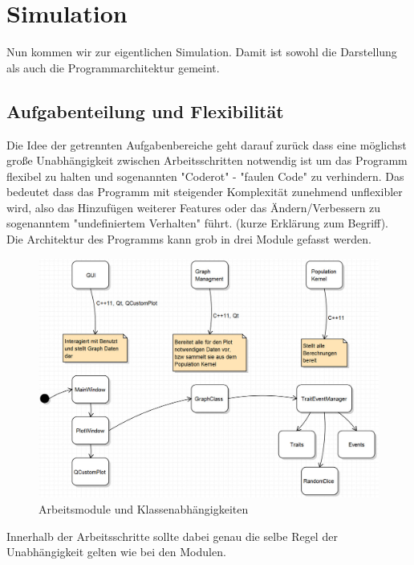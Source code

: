 \documentclass[11pt, a4paper, german]{article}
\begin{document}
\clearpage
\section{Simulation}

Nun kommen wir zur eigentlichen Simulation. Damit ist sowohl die Darstellung als auch die Programmarchitektur gemeint. 
	\subsection{Aufgabenteilung und Flexibilität}
	Die Idee der getrennten Aufgabenbereiche geht darauf zurück dass eine möglichst große Unabhängigkeit zwischen Arbeitsschritten notwendig ist um das Programm flexibel zu halten und sogenannten "{}Coderot"{} - "{}faulen Code"{} zu verhindern. Das bedeutet dass das Programm mit steigender Komplexität zunehmend unflexibler wird, also das Hinzufügen weiterer Features oder das Ändern/Verbessern zu sogenanntem "{}undefiniertem Verhalten"{} führt. (kurze Erklärung zum Begriff).\\
	Die Architektur des Programms kann grob in drei Module gefasst werden. 
	\begin{figure}[H]
		\centering
		\includegraphics[width=0.7\linewidth]{./Pictures/Bild_Module}
		\caption[Module]{Arbeitsmodule und Klassenabhängigkeiten}
		\label{Module und Klassen}
	\end{figure}
	Innerhalb der Arbeitsschritte sollte dabei genau die selbe Regel der Unabhängigkeit gelten wie bei den Modulen.
	
\end{document}
